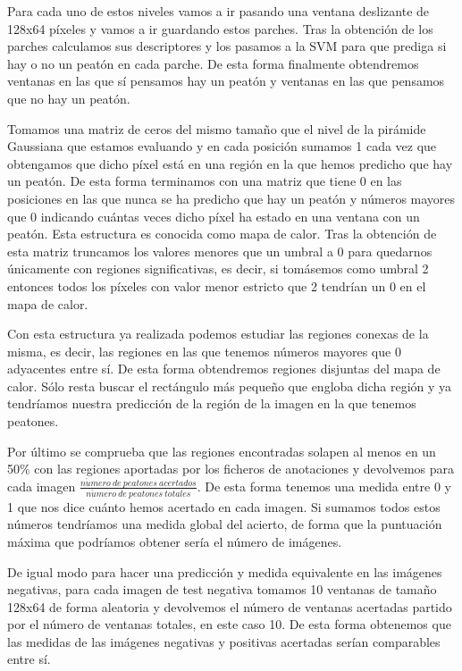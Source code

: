 \documentclass[a4paper,12pt]{article}
\begin{document}
Para cada uno de estos niveles vamos a ir pasando una ventana deslizante de 128x64 píxeles y vamos a ir guardando estos parches. Tras la obtención de los parches calculamos sus descriptores y los pasamos a la SVM para que prediga si hay o no un peatón en cada parche. De esta forma finalmente obtendremos ventanas en las que sí pensamos hay un peatón y ventanas en las que pensamos que no hay un peatón.

Tomamos una matriz de ceros del mismo tamaño que el nivel de la pirámide Gaussiana que estamos evaluando y en cada posición sumamos 1 cada vez que obtengamos que dicho píxel está en una región en la que hemos predicho que hay un peatón. De esta forma terminamos con una matriz que tiene 0 en las posiciones en las que nunca se ha predicho que hay un peatón y números mayores que 0 indicando cuántas veces dicho píxel ha estado en una ventana con un peatón. Esta estructura es conocida como mapa de calor. Tras la obtención de esta matriz truncamos los valores menores que un umbral a 0 para quedarnos únicamente con regiones significativas, es decir, si tomásemos como umbral 2 entonces todos los píxeles con valor menor estricto que 2 tendrían un 0 en el mapa de calor. 

Con esta estructura ya realizada podemos estudiar las regiones conexas de la misma, es decir, las regiones en las que tenemos números mayores que 0 adyacentes entre sí. De esta forma obtendremos regiones disjuntas del mapa de calor. Sólo resta buscar el rectángulo más pequeño que engloba dicha región y ya tendríamos nuestra predicción de la región de la imagen en la que tenemos peatones. 

Por último se comprueba que las regiones encontradas solapen al menos en un 50\% con las regiones aportadas por los ficheros de anotaciones y devolvemos para cada imagen $\frac{n\acute{u}mero \ de \ peatones \ acertados}{n\acute{u}mero \ de \ peatones \ totales}$. De esta forma tenemos una medida entre 0 y 1 que nos dice cuánto hemos acertado en cada imagen. Si sumamos todos estos números tendríamos una medida global del acierto, de forma que la puntuación máxima que podríamos obtener sería el número de imágenes. 

De igual modo para hacer una predicción y medida equivalente en las imágenes negativas, para cada imagen de test negativa tomamos 10 ventanas de tamaño 128x64 de forma aleatoria y devolvemos el número de ventanas acertadas partido por el número de ventanas totales, en este caso 10. De esta forma obtenemos que las medidas de las imágenes negativas y positivas acertadas serían comparables entre sí. 
\end{document}

